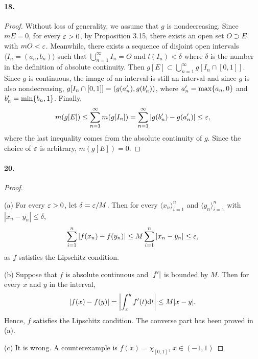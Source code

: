   \paragraph{18.}
  \begin{proof}
    Without loss of generality, we assume that $g$ is nondecreasing.
    Since $mE=0$, for every $\varepsilon>0$, by Proposition 3.15, there exists an open
    set $O\supset E$ with $mO<\varepsilon$. Meanwhile, there exists a sequence of 
    disjoint open intervals $\langle I_n=(a_n,b_n)\rangle$ such that 
    $\bigcup_{n=1}^\infty I_n=O$ and $l(I_n)<\delta$ where $\delta$ is the 
    number in the definition of absolute continuity. Then $g[E]\subset
    \bigcup_{n=1}^\infty g[I_n\cap[0,1]]$. Since $g$ is continuous, the image of
    an interval is still an interval and since $g$ is also nondecreasing, $g[I_n
    \cap[0,1]]=(g(a_n^\prime), g(b_n^\prime))$, where $a_n^\prime=\max\{a_n,0\}$ and $b_n^\prime
    =\min\{b_n,1\}$. Finally,
    \[
     m(g[E]) \le \sum_{n=1}^\infty m(g[I_n]) = \sum_{n=1}^\infty|g(b_n^\prime)-
     g(a_n^\prime)| \le \varepsilon,
    \]
    where the last inequality comes from the absolute continuity of $g$. Since
    the choice of $\varepsilon$ is arbitrary, $m(g[E])=0$.
  \end{proof}

  \paragraph{20.}
  \begin{proof}
    $\,$\par
    (a) For every $\varepsilon>0$, let $\delta=\varepsilon/M$. Then for every $\langle x_n
    \rangle_{i=1}^n$ and $\langle y_n\rangle_{i=1}^n$ with $|x_n-y_n|\le\delta$,
    \[
      \sum_{i=1}^n|f(x_n)-f(y_n)|\le M\sum_{i=1}^n|x_n-y_n| \le \varepsilon,
    \]
    as $f$ satisfies the Lipschitz condition.\par
    (b) Suppose that $f$ is absolute continuous and $|f^\prime|$ is bounded by $M$.
    Then for every $x$ and $y$ in the interval,
    \[
      |f(x)-f(y)|=\left|\int_x^y f^\prime(t)\mathrm{d} t\right| \le M|x-y|.
    \]
    Hence, $f$ satisfies the Lipschitz condition. The converse part has been 
    proved in (a).\par
    (c) It is wrong. A counterexample is $f(x)=\chi_{[0,1]}$, $x\in(-1,1)$
  \end{proof}

